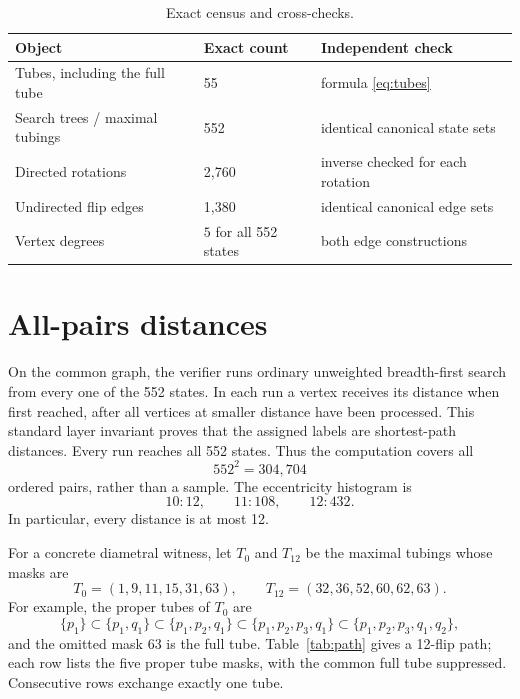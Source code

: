 \documentclass[11pt]{article}
\begin{document}
\begin{table}[ht]
\centering
\caption{Exact census and cross-checks.}\label{tab:census}
\begin{tabular}{@{}lll@{}}
\toprule
Object & Exact count & Independent check \\
\midrule
Tubes, including the full tube & 55 & formula \eqref{eq:tubes} \\
Search trees / maximal tubings & 552 & identical canonical state sets \\
Directed rotations & 2,760 & inverse checked for each rotation \\
Undirected flip edges & 1,380 & identical canonical edge sets \\
Vertex degrees & \(5\) for all 552 states & both edge constructions \\
\bottomrule
\end{tabular}
\end{table}

\section{All-pairs distances}

On the common graph, the verifier runs ordinary unweighted breadth-first
search from every one of the 552 states.  In each run a vertex receives its
distance when first reached, after all vertices at smaller distance have been
processed.  This standard layer invariant proves that the assigned labels are
shortest-path distances.  Every run reaches all 552 states.  Thus the
computation covers all
\[
  552^2=304{,}704
\]
ordered pairs, rather than a sample.  The eccentricity histogram is
\begin{equation}\label{eq:eccentricities}
  10:12,\qquad 11:108,\qquad 12:432.
\end{equation}
In particular, every distance is at most 12.

For a concrete diametral witness, let \(T_0\) and \(T_{12}\) be the maximal
tubings whose masks are
\[
 T_0=(1,9,11,15,31,63),\qquad
 T_{12}=(32,36,52,60,62,63).
\]
For example, the proper tubes of \(T_0\) are
\[
 \{p_1\}\subset\{p_1,q_1\}\subset
 \{p_1,p_2,q_1\}\subset\{p_1,p_2,p_3,q_1\}
 \subset\{p_1,p_2,p_3,q_1,q_2\},
\]
and the omitted mask 63 is the full tube.  Table~\ref{tab:path} gives a
12-flip path; each row lists the five proper tube masks, with the common full
tube suppressed.  Consecutive rows exchange exactly one tube.
\end{document}
